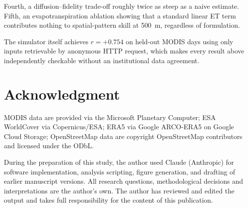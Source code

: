 \documentclass[journal]{IEEEtran}
\begin{document}
Fourth, a diffusion--fidelity trade-off roughly twice as steep as a naive
estimate. Fifth, an evapotranspiration ablation showing that a standard
linear ET term contributes nothing to spatial-pattern skill at 500~m,
regardless of formulation.

The simulator itself achieves $r = +0.754$ on held-out MODIS days using
only inputs retrievable by anonymous HTTP request, which makes every
result above independently checkable without an institutional data
agreement.

\section*{Acknowledgment}
MODIS data are provided via the Microsoft Planetary Computer; ESA
WorldCover via Copernicus/ESA; ERA5 via Google ARCO-ERA5 on Google Cloud
Storage; OpenStreetMap data are copyright OpenStreetMap contributors and
licensed under the ODbL.

During the preparation of this study, the author used Claude (Anthropic)
for software implementation, analysis scripting, figure generation, and
drafting of earlier manuscript versions. All research questions,
methodological decisions and interpretations are the author's own. The
author has reviewed and edited the output and takes full responsibility
for the content of this publication.
\end{document}
